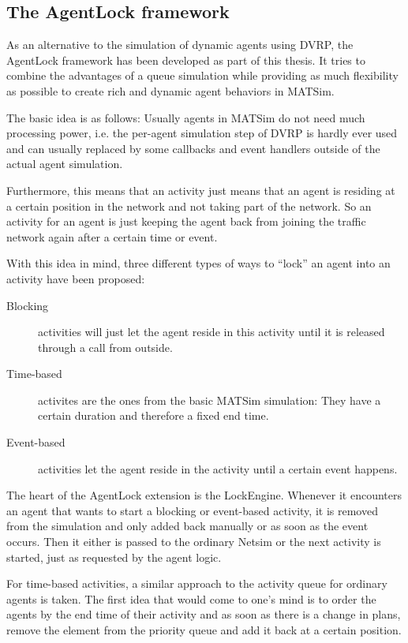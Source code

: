\subsection{The AgentLock framework}

As an alternative to the simulation of dynamic agents using DVRP, the AgentLock
framework has been developed as part of this thesis. It tries to combine the advantages
of a queue simulation while providing as much flexibility as possible to create
rich and dynamic agent behaviors in MATSim.

The basic idea is as follows: Usually agents in MATSim do not need much processing
power, i.e. the per-agent simulation step of DVRP is hardly ever used and can usually
replaced by some callbacks and event handlers outside of the actual agent simulation.

Furthermore, this means that an activity just means that an agent is residing
at a certain position in the network and not taking part of the network. So an
activity for an agent is just keeping the agent back from joining the traffic network
again after a certain time or event.

With this idea in mind, three different types of ways to ``lock'' an agent into
an activity have been proposed:

\begin{description}
    \item[Blocking] activities will just let the agent reside in this activity until
    it is released through a call from outside.
    \item[Time-based] activites are the ones from the basic MATSim simulation: They
    have a certain duration and therefore a fixed end time.
    \item[Event-based] activities let the agent reside in the activity until a certain
    event happens.
\end{description}

The heart of the AgentLock extension is the LockEngine. Whenever it encounters an
agent that wants to start a blocking or event-based activity, it is removed from
the simulation and only added back manually or as soon as the
event occurs. Then it either is passed to the ordinary Netsim or the next activity
is started, just as requested by the agent logic.

For time-based activities, a similar approach to the activity queue for ordinary
agents is taken. The first idea that would come to one's mind is to order the
agents by the end time of their activity and as soon as there is a change in plans,
remove the element from the priority queue and add it back at a certain position.


